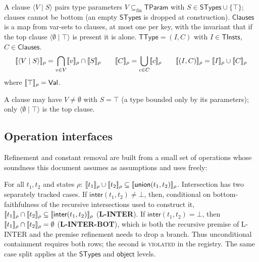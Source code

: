 \documentclass[11pt]{article}
\newcommand{\TType}{\mathsf{TType}}
\newcommand{\Clauses}{\mathsf{Clauses}}
\newcommand{\STypes}{\mathsf{STypes}}
\newcommand{\TInsts}{\mathsf{TInsts}}
\newcommand{\TParam}{\mathsf{TParam}}
\newcommand{\clause}[2]{\langle #1 \mid #2 \rangle}
\begin{document}
\begin{definition}
\label{def:clauses}
\leavevmode
\begin{keydef}
A clause $\clause{V}{S}$ pairs type parameters $V \subseteq_{\mathrm{fin}}
\TParam$ with $S \in \STypes \cup \{\top\}$; clauses cannot be bottom
(an empty $\STypes$ is dropped at construction). $\Clauses$ is a map from
var-sets to clauses, at most one per key, with the invariant that if the top
clause $\clause{\emptyset}{\top}$ is present it is alone. $\TType = (I, C)$
with $I \in \TInsts$, $C \in \Clauses$.
\[
\sem{\clause{V}{S}}_\rho = \bigcap_{v \in V}\sem{v}_\rho \cap \sem{S}_\rho
\qquad
\sem{C}_\rho = \bigcup_{c \in C}\sem{c}_\rho
\qquad
\sem{(I,C)}_\rho = \sem{I}_\rho \cup \sem{C}_\rho
\]
where $\llbracket \top \rrbracket_\rho = \mathsf{Val}$.
\end{keydef}
A clause may have $V \neq \emptyset$ with
$S = \top$ (a type bounded only by its parameters); only
$\clause{\emptyset}{\top}$ is the top clause.
\end{definition}

\subsection{Operation interfaces}
\label{sec:op-interfaces}

Refinement and constant removal are built from a small set of operations whose
soundness this document assumes as assumptions and uses freely:

\begin{axiom}
\label{ax:union-inter}
For all $t_1, t_2$ and states $\rho$:
$\llbracket t_1 \rrbracket_\rho \cup \llbracket t_2 \rrbracket_\rho \subseteq
 \llbracket \mathsf{union}(t_1,t_2) \rrbracket_\rho$. Intersection has two separately
tracked cases. If $\mathsf{inter}(t_1,t_2) \neq \bot$, then, conditional on
bottom-faithfulness of the recursive intersections used to construct it,
$\llbracket t_1 \rrbracket_\rho \cap \llbracket t_2 \rrbracket_\rho \subseteq
 \llbracket \mathsf{inter}(t_1,t_2) \rrbracket_\rho$ (\textbf{L-INTER}). If
$\mathsf{inter}(t_1,t_2) = \bot$, then
$\llbracket t_1 \rrbracket_\rho \cap \llbracket t_2 \rrbracket_\rho = \emptyset$
(\textbf{L-INTER-BOT}), which is both the recursive premise of L-INTER and
the premise refinement needs to drop a
branch. Thus unconditional containment requires both rows; the second is
\textsc{violated} in the registry. The same case split applies at the
$\STypes$ and $\mathsf{object}$ levels.
\end{axiom}
\end{document}

